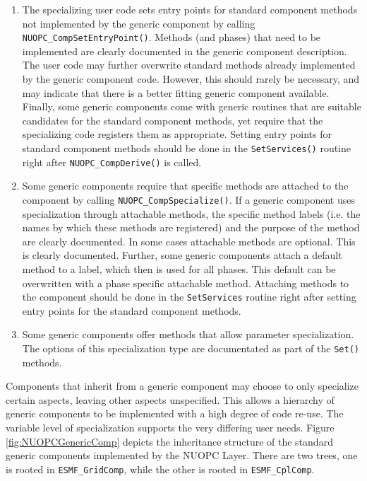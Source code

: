\begin{enumerate}

\item The specializing user code sets entry points for standard component methods not implemented by the generic component by calling {\tt NUOPC\_CompSetEntryPoint()}. Methods (and phases) that need to be implemented are clearly documented in the generic component description. The user code may further overwrite standard methods already implemented by the generic component code. However, this should rarely be necessary, and may indicate that there is a better fitting generic component available. Finally, some generic components come with generic routines that are suitable candidates for the standard component methods, yet require that the specializing code registers them as appropriate. Setting entry points for standard component methods should be done in the {\tt SetServices()} routine right after {\tt NUOPC\_CompDerive()} is called.

\item Some generic components require that specific methods are attached to the component by calling {\tt NUOPC\_CompSpecialize()}. If a generic component uses specialization through attachable methods, the specific method labels (i.e. the names by which these methods are registered) and the purpose of the method are clearly documented. In some cases attachable methods are optional. This is clearly documented. Further, some generic components attach a default method to a label, which then is used for all phases. This default can be overwritten with a phase specific attachable method. Attaching methods to the component should be done in the {\tt SetServices} routine right after setting entry points for the standard component methods.

\item Some generic components offer methods that allow parameter specialization. The options of this specialization type are documentated as part of the {\tt Set()} methods.

\end{enumerate}

Components that inherit from a generic component may choose to only specialize certain aspects, leaving other aspects unspecified. This allows a hierarchy of generic components to be implemented with a high degree of code re-use. The variable level of specialization supports the very differing user needs. Figure \ref{fig:NUOPCGenericComp} depicts the inheritance structure of the standard generic components implemented by the NUOPC Layer. There are two trees, one is rooted in {\tt ESMF\_GridComp}, while the other is rooted in {\tt ESMF\_CplComp}.

